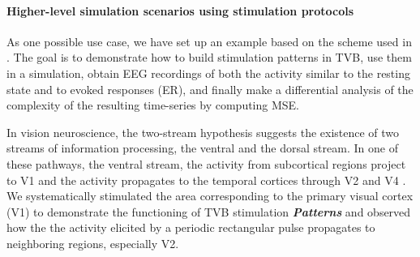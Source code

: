 \documentclass{bioinfo}
\newcommand*{\tvbdatatype}[1]{\textbf{\emph{#1}}}   %
\begin{document}

    \paragraph*{Higher-level simulation scenarios using stimulation protocols}
    As one possible use case, we have set up an example based on the scheme
    used in \citet{McIntosh_2010}. The goal is to demonstrate how to build
    stimulation patterns in TVB, use them in a simulation, obtain EEG 
    recordings of both the activity similar to the resting state  
    and to evoked responses (ER), and finally make a differential analysis 
    of the complexity of the resulting time-series by computing MSE.
    
    In vision neuroscience, the two-stream hypothesis \citep{Schneider_1969}
    suggests  the existence of two streams of information processing, the
    ventral and the dorsal  stream. In one of these pathways, the ventral
    stream, the activity from  subcortical regions project to V1 and the
    activity propagates to the temporal  cortices through V2 and V4
    \citep{Goodale_1992}. We systematically stimulated  the area corresponding
    to the primary visual cortex (V1) to demonstrate the  functioning of TVB
    stimulation \tvbdatatype{Patterns} and observed how the  the activity
    elicited by a periodic rectangular pulse propagates to neighboring
    regions, especially V2.
    

    
    
\end{document}
